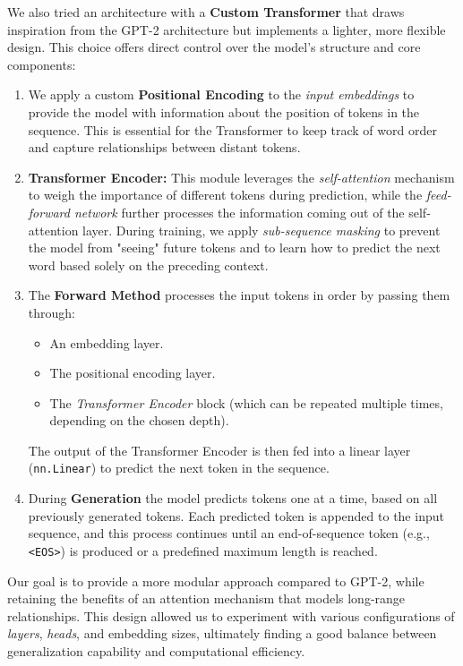 \documentclass[a4paper,12pt]{article}
\begin{document}
We also tried an architecture with a \textbf{Custom Transformer} that draws inspiration from the GPT-2 architecture but implements a lighter, more flexible design. 
This choice offers direct control over the model's structure and core components:

\begin{enumerate}
    \item We apply a custom \textbf{Positional Encoding} to the \textit{input embeddings} to provide the model with information about the position of tokens in the sequence. This is essential for the Transformer to keep track of word order and capture relationships between distant tokens.

    \item \textbf{Transformer Encoder:}  
    This module leverages the \textit{self-attention} mechanism to weigh the importance of different tokens during prediction, while the \textit{feed-forward network} further processes the information coming out of the self-attention layer. During training, we apply \textit{sub-sequence masking} to prevent the model from "seeing" future tokens and to learn how to predict the next word based solely on the preceding context.

    \item The \textbf{Forward Method} processes the input tokens in order by passing them through:
    \begin{itemize}
        \item An embedding layer.
        \item The positional encoding layer.
        \item The \textit{Transformer Encoder} block (which can be repeated multiple times, depending on the chosen depth).
    \end{itemize}
    The output of the Transformer Encoder is then fed into a linear layer (\texttt{nn.Linear}) to predict the next token in the sequence.

    \item During \textbf{Generation} the model predicts tokens one at a time, based on all previously generated tokens. Each predicted token is appended to the input sequence, and this process continues until an end-of-sequence token (e.g., \texttt{<EOS>}) is produced or a predefined maximum length is reached.
\end{enumerate}

\indent
Our goal is to provide a more modular approach compared to GPT-2, while retaining the benefits of an attention mechanism that models long-range relationships. This design allowed us to experiment with various configurations of \textit{layers}, \textit{heads}, and embedding sizes, ultimately finding a good balance between generalization capability and computational efficiency.
\end{document}
